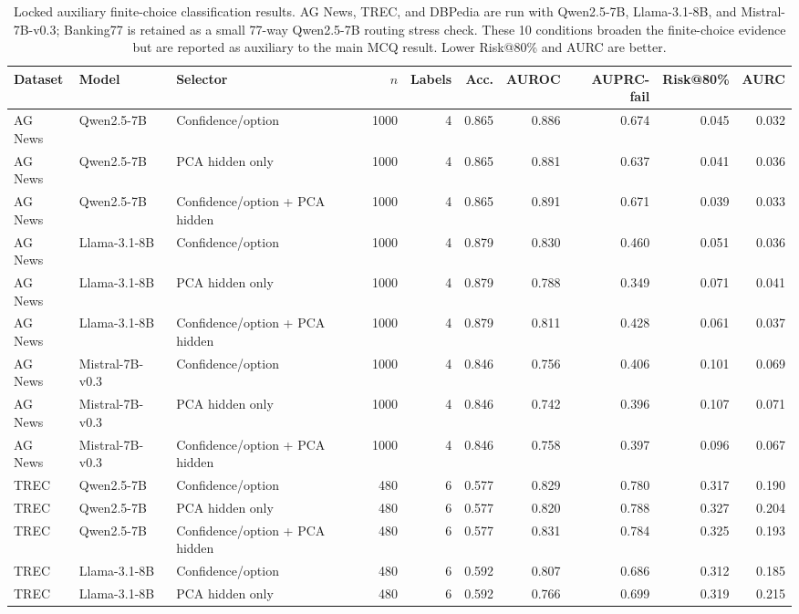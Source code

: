 
\begin{table}[t]
\centering
\scriptsize
\caption{Locked auxiliary finite-choice classification results. AG News, TREC, and DBPedia are run with Qwen2.5-7B, Llama-3.1-8B, and Mistral-7B-v0.3; Banking77 is retained as a small 77-way Qwen2.5-7B routing stress check. These 10 conditions broaden the finite-choice evidence but are reported as auxiliary to the main MCQ result. Lower Risk@80\% and AURC are better.}
\label{tab:nonmcq-extensions}
\begin{adjustbox}{width=\textwidth}
\begin{tabular}{lllrrrrrrr}
\toprule
Dataset & Model & Selector & $n$ & Labels & Acc. & AUROC & AUPRC-fail & Risk@80\% & AURC \\
\midrule
AG News & Qwen2.5-7B & Confidence/option & 1000 & 4 & 0.865 & 0.886 & 0.674 & 0.045 & 0.032 \\
AG News & Qwen2.5-7B & PCA hidden only & 1000 & 4 & 0.865 & 0.881 & 0.637 & 0.041 & 0.036 \\
AG News & Qwen2.5-7B & Confidence/option + PCA hidden & 1000 & 4 & 0.865 & 0.891 & 0.671 & 0.039 & 0.033 \\
AG News & Llama-3.1-8B & Confidence/option & 1000 & 4 & 0.879 & 0.830 & 0.460 & 0.051 & 0.036 \\
AG News & Llama-3.1-8B & PCA hidden only & 1000 & 4 & 0.879 & 0.788 & 0.349 & 0.071 & 0.041 \\
AG News & Llama-3.1-8B & Confidence/option + PCA hidden & 1000 & 4 & 0.879 & 0.811 & 0.428 & 0.061 & 0.037 \\
AG News & Mistral-7B-v0.3 & Confidence/option & 1000 & 4 & 0.846 & 0.756 & 0.406 & 0.101 & 0.069 \\
AG News & Mistral-7B-v0.3 & PCA hidden only & 1000 & 4 & 0.846 & 0.742 & 0.396 & 0.107 & 0.071 \\
AG News & Mistral-7B-v0.3 & Confidence/option + PCA hidden & 1000 & 4 & 0.846 & 0.758 & 0.397 & 0.096 & 0.067 \\
TREC & Qwen2.5-7B & Confidence/option & 480 & 6 & 0.577 & 0.829 & 0.780 & 0.317 & 0.190 \\
TREC & Qwen2.5-7B & PCA hidden only & 480 & 6 & 0.577 & 0.820 & 0.788 & 0.327 & 0.204 \\
TREC & Qwen2.5-7B & Confidence/option + PCA hidden & 480 & 6 & 0.577 & 0.831 & 0.784 & 0.325 & 0.193 \\
TREC & Llama-3.1-8B & Confidence/option & 480 & 6 & 0.592 & 0.807 & 0.686 & 0.312 & 0.185 \\
TREC & Llama-3.1-8B & PCA hidden only & 480 & 6 & 0.592 & 0.766 & 0.699 & 0.319 & 0.215 \\

\end{tabular}
\end{adjustbox}
\end{table}
